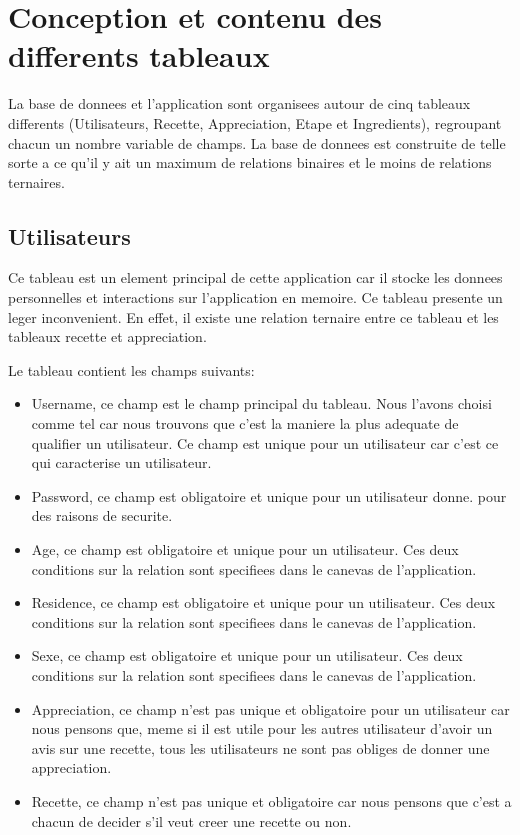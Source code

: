 \documentclass[a4paper,10pt]{report}
\begin{document}
\pagebreak

\chapter{Conception et contenu des differents tableaux}

La base de donnees et l'application sont organisees autour de cinq tableaux differents (Utilisateurs, Recette, Appreciation, Etape et Ingredients), regroupant chacun un nombre variable de champs.  La base de donnees est construite de telle sorte a ce qu'il y ait un maximum de relations binaires et le moins de relations ternaires.

\section{Utilisateurs}

Ce tableau est un element principal de cette application car il stocke les donnees personnelles et interactions sur l'application en memoire. Ce tableau presente un leger inconvenient. En effet, il existe une relation ternaire entre ce tableau et les tableaux recette et appreciation.

Le tableau contient les champs suivants:
\begin{itemize}
	\item Username, ce champ est le champ principal du tableau. Nous l'avons choisi comme tel car nous trouvons que c'est la maniere la plus adequate de qualifier un utilisateur. Ce champ est unique pour un utilisateur car c'est ce qui caracterise un utilisateur.
	\item Password, ce champ est obligatoire et unique pour un utilisateur donne. pour des raisons de securite.
	\item Age, ce champ est obligatoire et unique pour un utilisateur. Ces deux conditions sur la relation sont specifiees dans le canevas de l'application.
	\item Residence, ce champ est obligatoire et unique pour un utilisateur. Ces deux conditions sur la relation sont specifiees dans le canevas de l'application.
	\item Sexe, ce champ est obligatoire et unique pour un utilisateur. Ces deux conditions sur la relation sont specifiees dans le canevas de l'application.
	\item Appreciation, ce champ n'est pas unique et obligatoire pour un utilisateur car nous pensons que, meme si il est utile pour les autres utilisateur d'avoir un avis sur une recette, tous les utilisateurs ne sont pas obliges de donner une appreciation.
	\item Recette, ce champ n'est pas unique et obligatoire car nous pensons que c'est a chacun de decider s'il veut creer une recette ou non.
\end{itemize}
\end{document}
